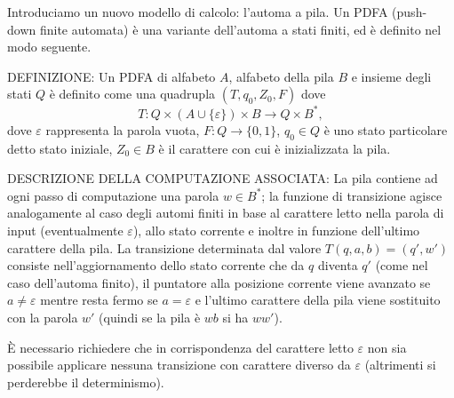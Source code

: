 
\begin{ex}
Introduciamo un nuovo modello di calcolo: l'automa a pila. Un PDFA (push-down finite automata) è una variante dell'automa a stati finiti, ed è definito nel modo seguente.

DEFINIZIONE: Un PDFA di alfabeto $A$, alfabeto della pila $B$ e insieme degli stati $Q$ è definito come una quadrupla $(T,q_0,Z_0,F)$ dove
\[
T:Q\times(A\cup\{\varepsilon\})\times B\to Q\times B^*,
\]
dove $\varepsilon$ rappresenta la parola vuota, $F:Q\to\{0,1\}$, $q_0\in Q$ è uno stato particolare detto stato iniziale, $Z_0\in B$ è il carattere con cui è inizializzata la pila.

DESCRIZIONE DELLA COMPUTAZIONE ASSOCIATA: La pila contiene ad ogni passo di computazione una parola $w\in B^*$; la funzione di transizione agisce analogamente al caso degli automi finiti in base al carattere letto nella parola di input (eventualmente $\varepsilon$), allo stato corrente e inoltre in funzione dell'ultimo carattere della pila. La transizione determinata dal valore $T(q,a,b)=(q',w')$ consiste nell'aggiornamento dello stato corrente che da $q$ diventa $q'$ (come nel caso dell'automa finito), il puntatore alla posizione corrente viene avanzato se $a\neq\varepsilon$ mentre resta fermo se $a=\varepsilon$ e l'ultimo carattere della pila viene sostituito con la parola $w'$ (quindi se la pila è $wb$ si ha $ww'$).

È necessario richiedere che in corrispondenza del carattere letto $\varepsilon$ non sia possibile applicare nessuna transizione con carattere diverso da $\varepsilon$ (altrimenti si perderebbe il determinismo).


\end{ex}
